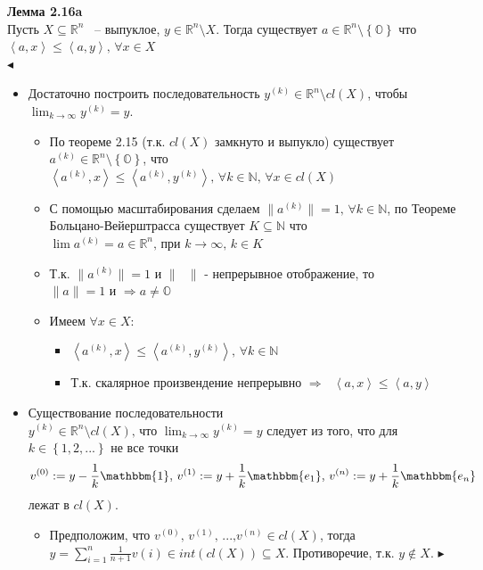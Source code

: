 \noindent\textbf{Лемма 2.16a}\\
Пусть $X\subseteq \mathbb{R}^n$ ~-- выпуклое, $y \in \mathbb{R}^{n} \setminus X$. Тогда существует $a \in \mathbb{R}^{n} \setminus \left\lbrace\mathbb{O}\right\rbrace$ что $\left\langle a,x \right\rangle \leq \left\langle a,y \right\rangle \text{, } \forall x \in X$\\
$\blacktriangleleft$
\begin{itemize}
\item Достаточно построить последовательность $y^{(k)} \in \mathbb{R}^{n} \setminus cl(X)$, чтобы $\lim_{k \rightarrow \infty} y^{(k)} =y$.
\begin{itemize}
\item  По теореме 2.15 (т.к. $cl(X)$ замкнуто и выпукло) существует  $a^{(k)} \in \mathbb{R}^{n} \setminus \left\lbrace \mathbb{O} \right\rbrace$, что  $\left\langle a^{(k)},x \right\rangle \leq \left\langle a^{(k)},y^{(k)} \right\rangle \text{, } \forall k \in \mathbb{N} \text{, } \forall x \in cl(X)$
\item С помощью масштабирования сделаем $\| a^{(k)}\| =1 \text{, } \forall k \in \mathbb{N}$, по Теореме Больцано-Вейерштрасса существует $K \subseteq \mathbb{N}$ что $\lim a^{(k)}=a \in \mathbb{R}^{n} \text{, при } k \rightarrow \infty \text{, } k \in K$
\item Т.к. $\| a^{(k)}\| =1$ и $\| \text{ } \|$ - непрерывное отображение, то $\| a\| =1 \text{ и } \Longrightarrow a \neq \mathbb{O} $
\item Имеем $\forall x \in X$:
\begin{itemize}
\item  $\left\langle a^{(k)},x \right\rangle \leq \left\langle a^{(k)},y^{(k)} \right\rangle \text{, } \forall k \in \mathbb{N}$
\item Т.к. скалярное произвендение непрерывно $\Longrightarrow \text{ } \left\langle a,x \right\rangle \leq \left\langle a,y \right\rangle$
\end{itemize}
\end{itemize}
\item Существование последовательности $y^{(k)} \in \mathbb{R}^{n} \setminus cl(X) \text{, что } \lim_{k \rightarrow \infty} y^{(k)}=y$ следует из того, что для $k \in \left\lbrace 1,2,\text{...}\right\rbrace$ не все точки
    \begin{equation*}
    v^{(0)}:=y -\frac{1}{k}\mathbbm{1} \text{, } v^{(1)}:=y +\frac{1}{k}\mathbbm{e_{1}} \text{, } v^{(n)}:=y +\frac{1}{k}\mathbbm{e_{n}}
    \end{equation*}
    лежат в $cl(X)$.
\begin{itemize}
\item Предположим, что $v^{(0)}\text{, }v^{(1)}\text{, ...,}v^{(n)} \in cl(X)$, тогда $\displaystyle y=\sum_{i=1}^{n}\frac{1}{n+1}v{(i)} \in int(cl(X)) \subseteq X$. Противоречие, т.к. $y \notin X$. $\blacktriangleright$
\end{itemize}
\end{itemize}

